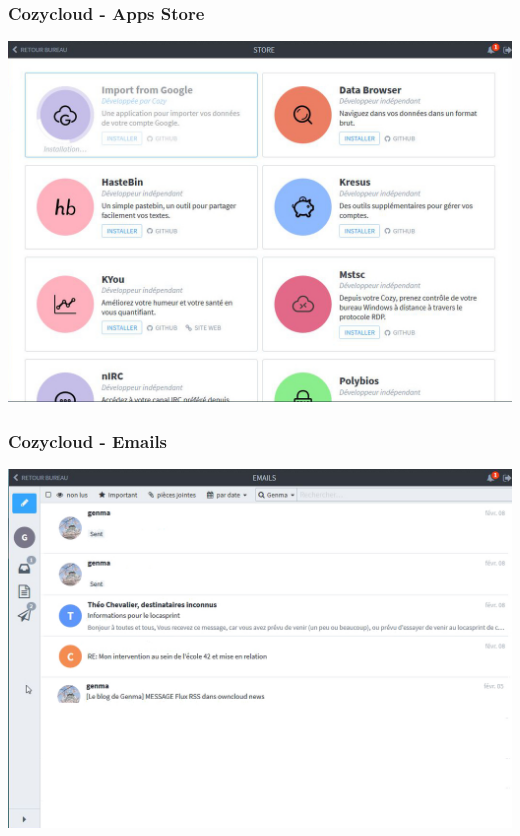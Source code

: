 \documentclass{beamer}
\begin{document}
\begin{frame}
\frametitle{Cozycloud - Apps Store}
\includegraphics[scale=0.3] {./CozyCloud/CozyCloud_Store.jpg}
\end{frame}

\begin{frame}
\frametitle{Cozycloud - Emails}
\includegraphics[scale=0.3] {./CozyCloud/CozyCloud_Emails.jpg}
\end{frame}
\end{document}
